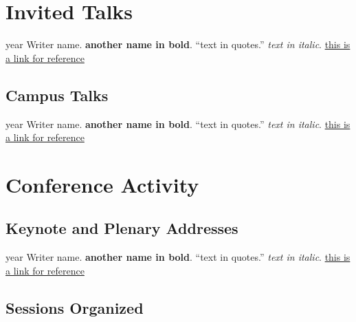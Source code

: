\documentclass[12pt,letterpaper]{report}
\begin{document}
    \section*{Invited Talks}

    \begin{tablist}

        \item[year] \tab{}Writer name. \textbf{another name in bold}. \enquote{text in quotes.} \textit{text in italic}. \href{https://this.is.a.link}{this is a link for reference}
        
    \end{tablist}

    \subsection*{Campus Talks}

    \begin{tablist}

        \item[year] \tab{}Writer name. \textbf{another name in bold}. \enquote{text in quotes.} \textit{text in italic}. \href{https://this.is.a.link}{this is a link for reference}

    \end{tablist}



    \section*{Conference Activity}

    \subsection*{Keynote and Plenary Addresses}

    \begin{tablist}

        \item[year] \tab{}Writer name. \textbf{another name in bold}. \enquote{text in quotes.} \textit{text in italic}. \href{https://this.is.a.link}{this is a link for reference}

    \end{tablist}

    \subsection*{Sessions Organized}
\end{document}
